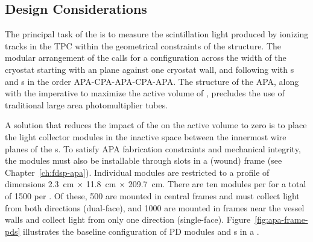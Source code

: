\subsection{Design Considerations}
\label{sec:fdsp-pd-des-consid}

The principal task of the   is to measure the  scintillation light produced by ionizing tracks in the TPC within the geometrical constraints of the  structure. The modular arrangement of the  calls for a configuration across the width of the cryostat starting with an  plane against one cryostat wall, and following with s and s in the order  APA-CPA-APA-CPA-APA.
The structure of the APA, along with the imperative to maximize the active volume of , precludes the use of traditional large area photomultiplier tubes.  

A solution that reduces the impact of the  on the active volume to zero is to place the light collector modules in the inactive space between the innermost wire planes of the s. To satisfy APA fabrication constraints and mechanical integrity, the modules must also be installable through slots in a (wound)  frame (see Chapter~\ref{ch:fdsp-apa}).  Individual  modules are restricted to a profile of dimensions \SI{2.3}{cm} $\times$ \SI{11.8}{cm} $\times$ \SI{209.7}{cm}.  There are ten  modules per  for a total of \num{1500} per .  Of these, \num{500} are mounted in central  frames and must collect light from both directions (dual-face), and \num{1000} are mounted in frames  near the vessel walls and collect light from only one direction (single-face).
Figure~\ref{fig:apa-frame-pds}
illustrates the baseline configuration of PD modules and s in a . 

